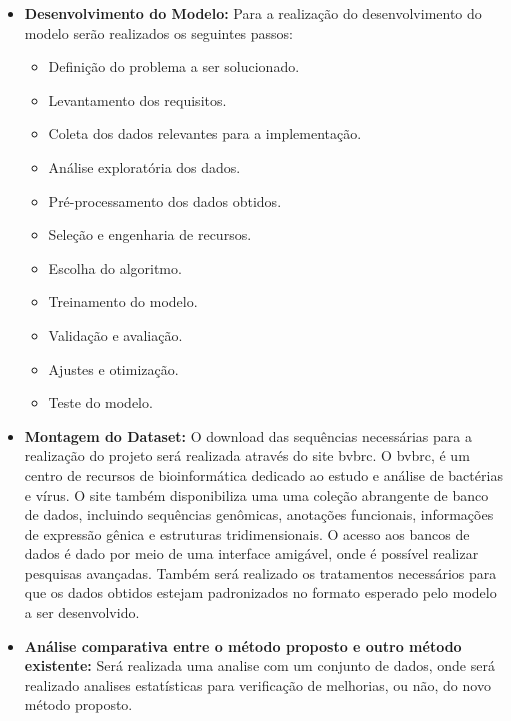 \begin{itemize}
  \item \textbf{Desenvolvimento do Modelo:} Para a realização do desenvolvimento do modelo serão realizados os seguintes passos:
        \begin{itemize}
          \item Definição do problema a ser solucionado.
          \item Levantamento dos requisitos.
          \item Coleta dos dados relevantes para a implementação.
          \item Análise exploratória dos dados.
          \item Pré-processamento dos dados obtidos.
          \item Seleção e engenharia de recursos.
          \item Escolha do algoritmo.
          \item Treinamento do modelo.
          \item Validação e avaliação.
          \item Ajustes e otimização.
          \item Teste do modelo.
        \end{itemize}

  \item \textbf{Montagem do Dataset:} O download das sequências necessárias para a realização do projeto será realizada através do site \gls{bvbrc}. O \gls{bvbrc}, é um centro de recursos de bioinformática dedicado ao estudo e análise de bactérias e vírus. O site também disponibiliza uma uma coleção abrangente de banco de dados, incluindo sequências genômicas, anotações funcionais, informações de expressão gênica e estruturas tridimensionais. O acesso aos bancos de dados é dado por meio de uma interface amigável, onde é possível realizar pesquisas avançadas.
        Também será realizado os tratamentos necessários para que os dados obtidos estejam padronizados no formato esperado pelo modelo a ser desenvolvido.

  \item \textbf{Análise comparativa entre o método proposto e outro método existente:} Será realizada uma analise com um conjunto de dados, onde será realizado analises estatísticas para verificação de melhorias, ou não, do novo método proposto.
\end{itemize}


